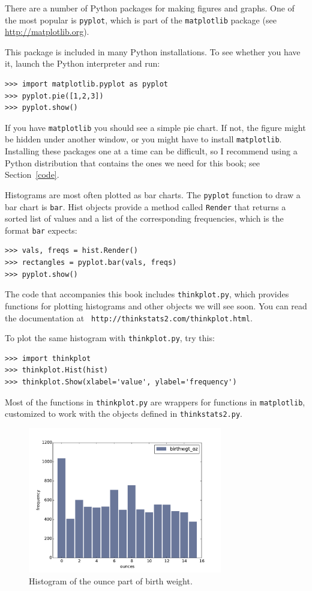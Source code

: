 \documentclass[12pt]{book}
\begin{document}
There are a number of Python packages for making figures and graphs.
One of the most popular is {\tt pyplot}, which is part of
the {\tt matplotlib} package (see \url{http://matplotlib.org}).

This package is included in many Python installations.  To see whether
you have it, launch the Python interpreter and run:
%
\begin{verbatim}
>>> import matplotlib.pyplot as pyplot
>>> pyplot.pie([1,2,3])
>>> pyplot.show()
\end{verbatim}

If you have {\tt matplotlib} you should see a simple pie chart.
If not, the figure might be hidden under another window, or you
might have to install {\tt matplotlib}.  Installing these packages
one at a time can be difficult, so I recommend using a Python
distribution that contains the ones we need for this book;
see Section~\ref{code}.

Histograms are most often plotted as bar charts.  The
{\tt pyplot} function to draw a bar chart is {\tt bar}.  Hist
objects provide a method called {\tt Render} that returns a sorted
list of values and a list of the corresponding frequencies, which
is the format {\tt bar} expects:
%
\begin{verbatim}
>>> vals, freqs = hist.Render()
>>> rectangles = pyplot.bar(vals, freqs)
>>> pyplot.show()
\end{verbatim}

The code that accompanies this book includes {\tt thinkplot.py}, which
provides functions for plotting histograms and other objects we will
see soon.  You can read the documentation at {\tt
  http://thinkstats2.com/thinkplot.html}.  

To plot the same histogram with {\tt thinkplot.py}, try this:

\begin{verbatim}
>>> import thinkplot
>>> thinkplot.Hist(hist)
>>> thinkplot.Show(xlabel='value', ylabel='frequency')
\end{verbatim}

Most of the functions in {\tt thinkplot.py} are wrappers for
functions in {\tt matplotlib}, customized to work with
the objects defined in {\tt thinkstats2.py}.

\begin{figure}
\centerline{\includegraphics[height=2.5in]{figs/first_wgt_oz_hist.pdf}}
\caption{Histogram of the ounce part of birth weight.}
\label{first_wgt_oz_hist}
\end{figure}
\end{document}
